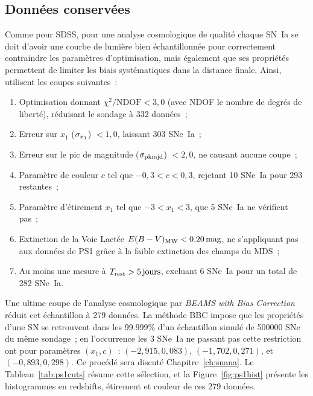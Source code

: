 \documentclass[../main/main.tex]{subfiles}
\begin{document}
\subsection{Données conservées}\label{sec:ps1data}

Comme pour SDSS, pour une analyse cosmologique de qualité chaque SN~Ia se doit
d'avoir une courbe de lumière bien échantillonnée pour correctement contraindre
les paramètres d'optimisation, mais également que ses propriétés permettent de
limiter les biais systématiques dans la distance finale.
Ainsi,~\cite{scolnic2018} utilisent les coupes suivantes~:
\begin{enumerate}
    \item Optimisation donnant $\chi^2/\mathrm{NDOF} < 3,0$ (avec NDOF le nombre
        de degrés de liberté), réduisant le sondage à 332 données~;
    \item Erreur sur $x_1$ ($\sigma_{x_1}$) $< 1,0$, laissant 303 SNe~Ia~;
    \item Erreur sur le pic de magnitude ($\sigma_{\rm pkmjd}$) $< 2,0$, ne causant
        aucune coupe~;
    \item Paramètre de couleur $c$ tel que $-0,3 < c < 0,3$, rejetant 10 SNe~Ia
        pour 293 restantes~;
    \item Paramètre d'étirement $x_1$ tel que $-3 < x_1 < 3$, que 5 SNe~Ia ne
        vérifient pas~;
    \item Extinction de la Voie Lactée $E(B-V)_{\rm MW}< \SI{0,20}{mag}$, ne
        s'appliquant pas aux données de PS1 grâce à la faible extinction des
        champs du MDS~;
    \item Au moins une mesure à $T_{\rm rest} > \SI{5}{jours}$, excluant 6
        SNe~Ia pour un total de 282 SNe~Ia.
\end{enumerate}
Une ultime coupe de l'analyse cosmologique par \textit{BEAMS with Bias
Correction} \citep[BBC,][]{kessler2017} réduit cet échantillon à 279 données. La
méthode BBC impose que les propriétés d'une SN se retrouvent dans les 99.999\%
d'un échantillon simulé de \num{500 000} SNe du même sondage~; en l'occurrence
les 3 SNe~Ia ne passant pas cette restriction ont pour paramètres $(x_1,c)$~:
$(−2,915, 0,083)$, $(−1,702, 0,271)$, et $(−0,893, 0,298)$. Ce procédé sera
discuté Chapitre~\ref{ch:snana}. Le Tableau~\ref{tab:ps1cuts} résume cette
sélection, et la Figure~\ref{fig:ps1hist} présente les histogrammes en
redshifts, étirement et couleur de ces 279 données.
\end{document}
